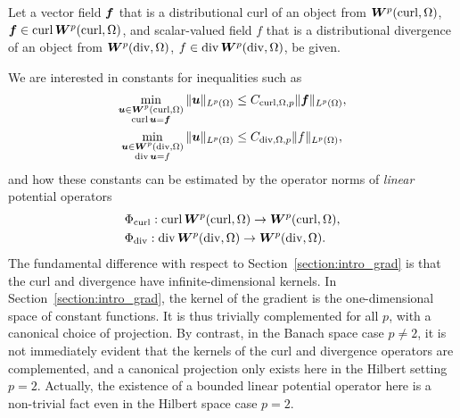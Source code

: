 \documentclass[10pt,a4paper]{article}
\newcommand\cye[1]{%
\protect\leavevmode
\begingroup
    \color{blue}%
    #1%
\endgroup
}
\begin{document}
\cye{Let a vector field $\bm{f}$ that is a distributional curl of an object from $\bm{W}^{p}(\operatorname{curl},\Omega)$, $\bm{f} \in \operatorname{curl} \bm{W}^{p}(\operatorname{curl},\Omega)$, and scalar-valued field $f$ that is a distributional divergence of an object from $\bm{W}^{p}(\operatorname{div},\Omega)$, $f \in \operatorname{div} \bm{W}^{p}(\operatorname{div},\Omega)$, be given.} 
We are interested in constants for inequalities such as 
\begin{subequations}\label{math:pot_PF_curl_div} \begin{align}
    \min\limits_{ \substack{ \bm{u} \in \bm{W}^{p}(\operatorname{curl},\Omega) \\ \operatorname{curl} \bm{u} = \bm{f} } } 
    \| \bm{u} \|_{L^{p}(\Omega)}
    &\leq 
    C_{\operatorname{curl},\Omega,p}
    \| \bm{f} \|_{L^{p}(\Omega)} \label{math:pot_PF_curl}
    ,
    \\
    \min\limits_{ \substack{ \bm{u} \in \bm{W}^{p}(\operatorname{div},\Omega) \\ \operatorname{div} \bm{u} = f } } 
    \| \bm{u} \|_{L^{p}(\Omega)}
    &\leq 
    C_{\operatorname{div},\Omega,p}
    \| f \|_{L^{p}(\Omega)} \label{math:pot_PF_div}
    ,
\end{align}\end{subequations}
and how these constants can be estimated by the operator norms of {\em linear} potential operators 
\begin{align*}
    &\Phi_{\operatorname{curl}} : \operatorname{curl} \bm{W}^{p}(\operatorname{curl},\Omega) \rightarrow \bm{W}^{p}(\operatorname{curl},\Omega)
    ,
    \\
    &\Phi_{\operatorname{div}} : \operatorname{div} \bm{W}^{p}(\operatorname{div},\Omega) \rightarrow \bm{W}^{p}(\operatorname{div},\Omega)
    .
\end{align*}
The fundamental difference \cye{with respect to Section~\ref{section:intro_grad}} is that the curl and divergence have infinite-dimensional kernels. In Section~\ref{section:intro_grad}, the kernel of the gradient is the one-dimensional space of constant functions. It is thus trivially complemented for all $p$, with a canonical choice of projection. By contrast, in the Banach space case $p \neq 2$, it is not immediately evident that the kernels of the curl and divergence operators are complemented, and a canonical projection only exists here in the Hilbert setting $p=2$. \cye{Actually,} the existence of a bounded linear potential operator here is a non-trivial fact even in the Hilbert space case $p = 2$. 
\end{document}
